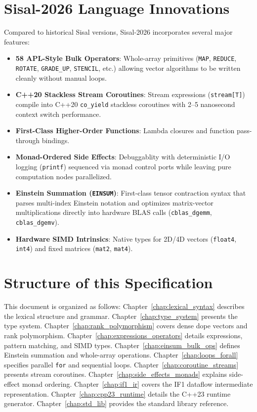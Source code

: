 \section{Sisal-2026 Language Innovations}
Compared to historical Sisal versions, Sisal-2026 incorporates several major features:
\begin{itemize}
    \item \textbf{58 APL-Style Bulk Operators}: Whole-array primitives (\texttt{MAP}, \texttt{REDUCE}, \texttt{ROTATE}, \texttt{GRADE\_UP}, \texttt{STENCIL}, etc.) allowing vector algorithms to be written cleanly without manual loops.
    \item \textbf{C++20 Stackless Stream Coroutines}: Stream expressions (\texttt{stream[T]}) compile into C++20 \texttt{co\_yield} stackless coroutines with 2--5 nanosecond context switch performance.
    \item \textbf{First-Class Higher-Order Functions}: Lambda closures and function pass-through bindings.
    \item \textbf{Monad-Ordered Side Effects}: Debuggablity with deterministic I/O logging (\texttt{printf}) sequenced via monad control ports while leaving pure computation nodes parallelized.
    \item \textbf{Einstein Summation (\texttt{EINSUM})}: First-class tensor contraction syntax that parses multi-index Einstein notation and optimizes matrix-vector multiplications directly into hardware BLAS calls (\texttt{cblas\_dgemm}, \texttt{cblas\_dgemv}).
    \item \textbf{Hardware SIMD Intrinsics}: Native types for 2D/4D vectors (\texttt{float4}, \texttt{int4}) and fixed matrices (\texttt{mat2}, \texttt{mat4}).
\end{itemize}

\section{Structure of this Specification}
This document is organized as follows:
Chapter~\ref{chap:lexical_syntax} describes the lexical structure and grammar.
Chapter~\ref{chap:type_system} presents the type system.
Chapter~\ref{chap:rank_polymorphism} covers dense dope vectors and rank polymorphism.
Chapter~\ref{chap:expressions_operators} details expressions, pattern matching, and SIMD types.
Chapter~\ref{chap:einsum_bulk_ops} defines Einstein summation and whole-array operations.
Chapter~\ref{chap:loops_forall} specifies parallel \texttt{for} and sequential loops.
Chapter~\ref{chap:coroutine_streams} presents stream coroutines.
Chapter~\ref{chap:side_effects_monads} explains side-effect monad ordering.
Chapter~\ref{chap:if1_ir} covers the IF1 dataflow intermediate representation.
Chapter~\ref{chap:cpp23_runtime} details the C++23 runtime generator.
Chapter~\ref{chap:std_lib} provides the standard library reference.
